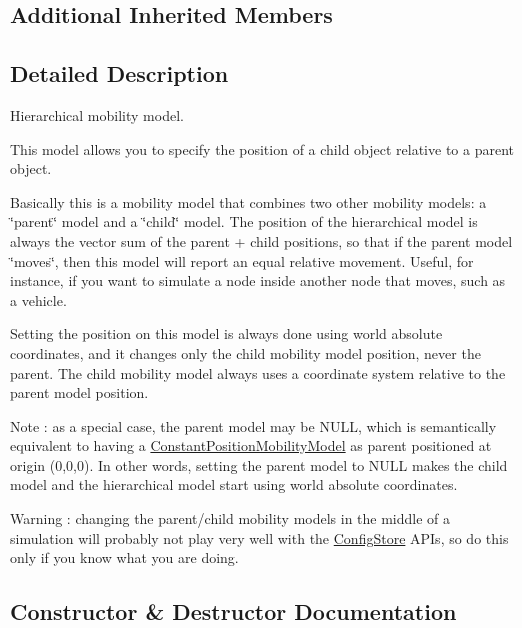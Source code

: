 \subsection*{Additional Inherited Members}


\subsection{Detailed Description}
Hierarchical mobility model. 

This model allows you to specify the position of a child object relative to a parent object.

Basically this is a mobility model that combines two other mobility models\+: a \char`\"{}parent\char`\"{} model and a \char`\"{}child\char`\"{} model. The position of the hierarchical model is always the vector sum of the parent + child positions, so that if the parent model \char`\"{}moves\char`\"{}, then this model will report an equal relative movement. Useful, for instance, if you want to simulate a node inside another node that moves, such as a vehicle.

Setting the position on this model is always done using world absolute coordinates, and it changes only the child mobility model position, never the parent. The child mobility model always uses a coordinate system relative to the parent model position.

\begin{DoxyNote}{Note}
\+: as a special case, the parent model may be N\+U\+LL, which is semantically equivalent to having a \hyperlink{classns3_1_1ConstantPositionMobilityModel}{Constant\+Position\+Mobility\+Model} as parent positioned at origin (0,0,0). In other words, setting the parent model to N\+U\+LL makes the child model and the hierarchical model start using world absolute coordinates.
\end{DoxyNote}
\begin{DoxyWarning}{Warning}
\+: changing the parent/child mobility models in the middle of a simulation will probably not play very well with the \hyperlink{classns3_1_1ConfigStore}{Config\+Store} A\+P\+Is, so do this only if you know what you are doing. 
\end{DoxyWarning}


\subsection{Constructor \& Destructor Documentation}
